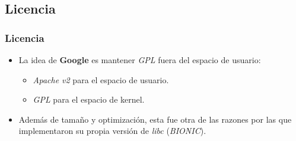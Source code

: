 \subsection{Licencia}
\begin{frame}
  \frametitle{Licencia}
  \begin{itemize}
      \item La idea de \textbf{Google} es mantener \textit{GPL} fuera del espacio de usuario:
      \begin{itemize}
	  \item \textit{Apache v2} para el espacio de usuario.
	  
	  \item \textit{GPL} para el espacio de kernel.
      \end{itemize}
      
      \item Además de tamaño y optimización, esta fue otra de las razones por las que implementaron su propia versión de \textit{libc} (\textit{BIONIC}).
  \end{itemize}
\end{frame}